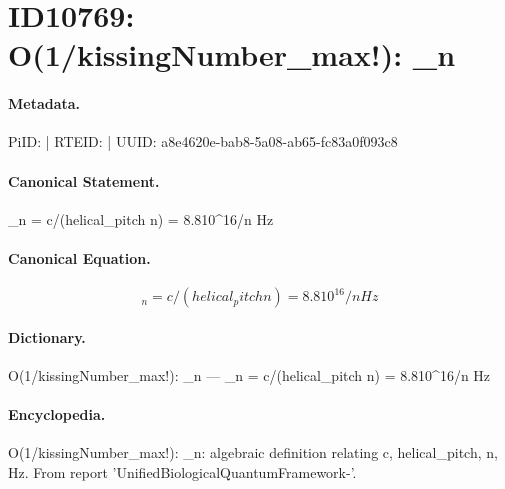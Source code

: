 \section*{ID10769: O(1/kissingNumber\_max!): \_n}
\paragraph{Metadata.}
PiID:  | RTEID:  | UUID: a8e4620e-bab8-5a08-ab65-fc83a0f093c8

\paragraph{Canonical Statement.}
\_n = c/(helical\_pitch n) = 8.810\textasciicircum{}16/n Hz

\paragraph{Canonical Equation.}
\[
_n = c/(helical_pitch  n) = 8.810^16/n Hz
\]

\paragraph{Dictionary.}
O(1/kissingNumber\_max!): \_n — \_n = c/(helical\_pitch  n) = 8.810\textasciicircum{}16/n Hz

\paragraph{Encyclopedia.}
O(1/kissingNumber\_max!): \_n: algebraic definition relating c, helical\_pitch, n, Hz. From report 'UnifiedBiologicalQuantumFramework-'.
